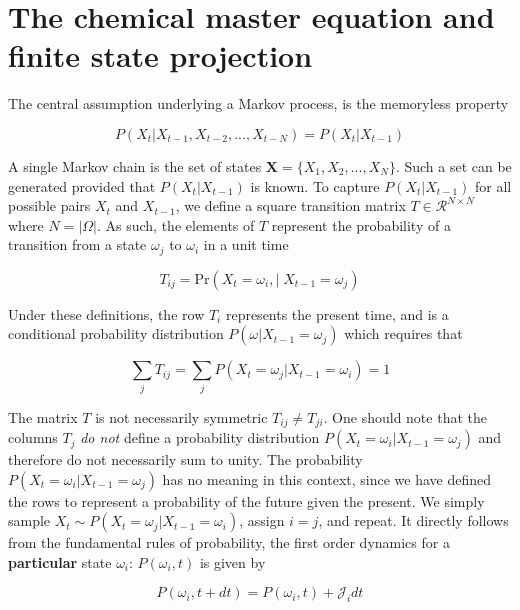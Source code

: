 \documentclass{ucetd}
\begin{document}
\section{The chemical master equation and finite state projection}

The central assumption underlying a Markov process, is the memoryless property

\begin{equation*}
P(X_{t}|X_{t-1}, X_{t-2}, ..., X_{t-N}) = P(X_{t}|X_{t-1})
\end{equation*}

A single Markov chain is the set of states $\bm{X} = \{X_{1},X_{2},...,X_{N}\}$. Such a set can be generated provided that $P(X_{t}|X_{t-1})$ is known. To capture $P(X_{t}|X_{t-1})$ for all possible pairs $X_{t}$ and $X_{t-1}$, we define a square transition matrix $T\in \mathcal{R}^{N\times N}$ where $N = |\Omega|$. As such, the elements of $T$ represent the probability of a transition from a state $\omega_{j}$ to $\omega_{i}$ in a unit time

\begin{equation*}
T_{ij} = \mathrm{Pr}\left(X_{t}=\omega_{i}, | \;X_{t-1}=\omega_{j}\right)
\end{equation*}

Under these definitions, the row $T_{i}$ represents the present time, and is a conditional  probability distribution $P(\omega | X_{t-1} = \omega_{j})$ which requires that

\begin{equation*}
\sum_{j}T_{ij} = \sum_{j} P(X_{t} = \omega_{j} | X_{t-1} = \omega_{i}) = 1
\end{equation*}

The matrix $T$ is not necessarily symmetric $T_{ij} \neq T_{ji}$. One should note that the columns $T_{j}$ \emph{do not} define a probability distribution $P(X_{t} = \omega_{i} | X_{t-1} = \omega_{j})$ and therefore do not necessarily sum to unity. The probability $P(X_{t} = \omega_{i} | X_{t-1} = \omega_{j})$ has no meaning in this context, since we have defined the rows to represent a probability of the future given the present. We simply sample $X_{t} \sim P(X_{t} = \omega_{j} | X_{t-1} = \omega_{i})$, assign $i=j$, and repeat. It directly follows from the fundamental rules of probability, the first order dynamics for a \textbf{particular} state $\omega_{i}$: $P(\omega_{i},t)$ is given by

\begin{equation}
P(\omega_{i},t+dt) = P(\omega_{i},t) + \mathcal{J}_{i}dt
\end{equation}
\end{document}
